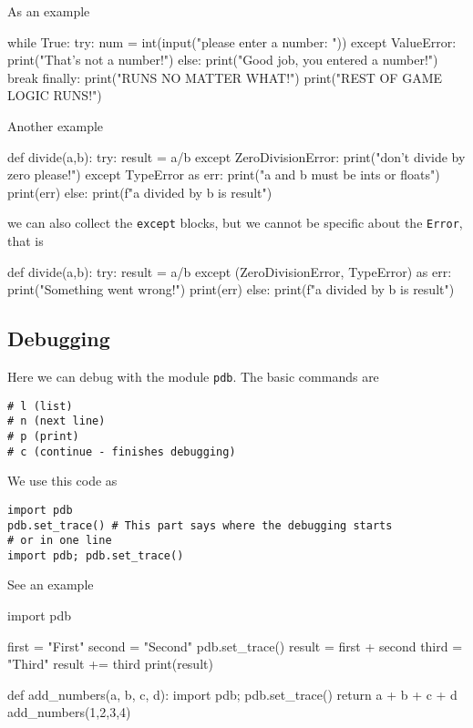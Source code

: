 As an example
\begin{listing}{1}
while True:
    try:
        num = int(input("please enter a number: "))
    except ValueError:
    	print("That's not a number!")
    else:
    	print("Good job, you entered a number!")
    	break
    finally:
    	print("RUNS NO MATTER WHAT!")
print("REST OF GAME LOGIC RUNS!")        
\end{listing}

Another example
\begin{listing}{1}
def divide(a,b):
    try:
    	result = a/b
    except ZeroDivisionError:
    	print("don't divide by zero please!")
    except TypeError as err:
    	print("a and b must be ints or floats")
    	print(err)
    else:
    	print(f"{a} divided by {b} is {result}")    
\end{listing}
we can also collect the \verb|except| blocks, but we cannot be specific about the \verb|Error|, that is
\begin{listing}{1}
def divide(a,b):
    try:
    	result = a/b
    except (ZeroDivisionError, TypeError) as err:
    	print("Something went wrong!")
    	print(err)
    else:
    	print(f"{a} divided by {b} is {result}")    
\end{listing}

\subsection{Debugging}

Here we can debug with the module \verb|pdb|. The basic commands are
\begin{verbatim}
# l (list)
# n (next line)
# p (print)
# c (continue - finishes debugging)        
\end{verbatim}
We use this code as
\begin{verbatim}
import pdb
pdb.set_trace() # This part says where the debugging starts
# or in one line
import pdb; pdb.set_trace()    
\end{verbatim}

See an example 
\begin{listing}{1}
import pdb

first = "First"
second = "Second"
pdb.set_trace()
result = first + second
third = "Third"
result += third
print(result)

def add_numbers(a, b, c, d):
    import pdb; pdb.set_trace() 
    return a + b + c + d
add_numbers(1,2,3,4)        
\end{listing}